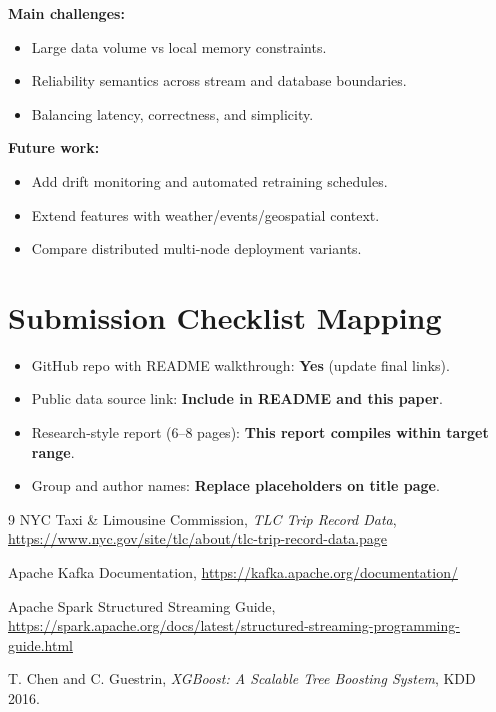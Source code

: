 \documentclass[11pt]{article}
\begin{document}
\textbf{Main challenges:}
\begin{itemize}[leftmargin=1.5em]
    \item Large data volume vs local memory constraints.
    \item Reliability semantics across stream and database boundaries.
    \item Balancing latency, correctness, and simplicity.
\end{itemize}

\textbf{Future work:}
\begin{itemize}[leftmargin=1.5em]
    \item Add drift monitoring and automated retraining schedules.
    \item Extend features with weather/events/geospatial context.
    \item Compare distributed multi-node deployment variants.
\end{itemize}

\section*{Submission Checklist Mapping}
\begin{itemize}[leftmargin=1.5em]
    \item GitHub repo with README walkthrough: \textbf{Yes} (update final links).
    \item Public data source link: \textbf{Include in README and this paper}.
    \item Research-style report (6--8 pages): \textbf{This report compiles within target range}.
    \item Group and author names: \textbf{Replace placeholders on title page}.
\end{itemize}

\begin{thebibliography}{9}
NYC Taxi \& Limousine Commission,
\textit{TLC Trip Record Data},
\url{https://www.nyc.gov/site/tlc/about/tlc-trip-record-data.page}

Apache Kafka Documentation,
\url{https://kafka.apache.org/documentation/}

Apache Spark Structured Streaming Guide,
\url{https://spark.apache.org/docs/latest/structured-streaming-programming-guide.html}

T. Chen and C. Guestrin,
\textit{XGBoost: A Scalable Tree Boosting System}, KDD 2016.
\end{thebibliography}
\end{document}
